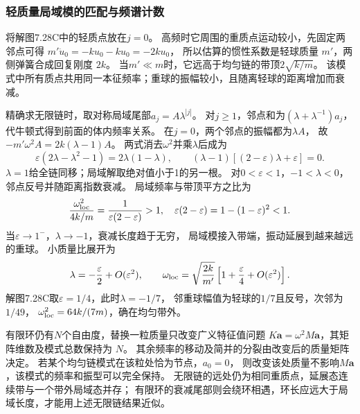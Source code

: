\documentclass[UTF8,fontset=fandol,a4paper,11pt]{ctexart}
\begin{document}
\subsubsection*{轻质量局域模的匹配与频谱计数}
将解图7.28C中的轻质点放在$j=0$。
高频时它周围的重质点运动较小，先固定两邻点可得
$m'\ddot u_0=-k u_0-k u_0=-2ku_0$，
所以估算的惯性系数是轻球质量 $m'$，两侧弹簧合成回复刚度 $2k$。
当$m'\ll m$时，它远高于均匀链的带顶$2\sqrt{k/m}$。
该模式中所有质点共用同一本征频率；重球的振幅较小，且随离轻球的距离增加而衰减。

精确求无限链时，取对称局域尾部$a_j=A\lambda^{|j|}$。
对$j\ge1$，邻点和为$(\lambda+\lambda^{-1})a_j$，
代牛顿式得到前面的体内频率关系。
在$j=0$，两个邻点的振幅都为$\lambda A$，
故$-m'\omega^2 A=2k(\lambda-1)A$。
两式消去$\omega^2$并乘$\lambda$后成为
\[
\varepsilon(2\lambda-\lambda^2-1)=2\lambda(1-\lambda),
\qquad(\lambda-1)[(2-\varepsilon)\lambda+\varepsilon]=0.
\]
$\lambda=1$给全链同移；局域解取绝对值小于1的另一根。
对$0<\varepsilon<1$，$-1<\lambda<0$，邻点反号并随距离指数衰减。
局域频率与带顶平方之比为
\[
\frac{\omega_{\rm loc}^2}{4k/m}
=\frac1{\varepsilon(2-\varepsilon)}>1,
\quad\varepsilon(2-\varepsilon)=1-(1-\varepsilon)^2<1.
\]
当$\varepsilon\to1^-$，$\lambda\to-1$，衰减长度趋于无穷，
局域模接入带端，振动延展到越来越远的重球。
小质量比展开为
\[
\lambda=-\frac\varepsilon2+O(\varepsilon^2),\qquad
\omega_{\rm loc}=\sqrt{\frac{2k}{m'}}
\left[1+\frac\varepsilon4+O(\varepsilon^2)\right].
\]
解图7.28C取$\varepsilon=1/4$，此时$\lambda=-1/7$，
邻重球幅值为轻球的$1/7$且反号，次邻为$1/49$，
$\omega_{\rm loc}^2=64k/(7m)$，确在均匀带外。

有限环仍有$N$个自由度，替换一粒质量只改变广义特征值问题
$K\boldsymbol a=\omega^2M\boldsymbol a$，其矩阵维数及模式总数保持为 $N$。
其余频率的移动及简并的分裂由改变后的质量矩阵决定。
若某个均匀链模式在该粒处恰为节点，$a_0=0$，
则改变该处质量不影响$M\boldsymbol a$，该模式的频率和振型可以完全保持。
无限链的远处仍为相同重质点，延展态连续带与一个带外局域态并存；
有限环的衰减尾部则会绕环相遇，环长应远大于局域长度，才能用上述无限链结果近似。
\end{document}
